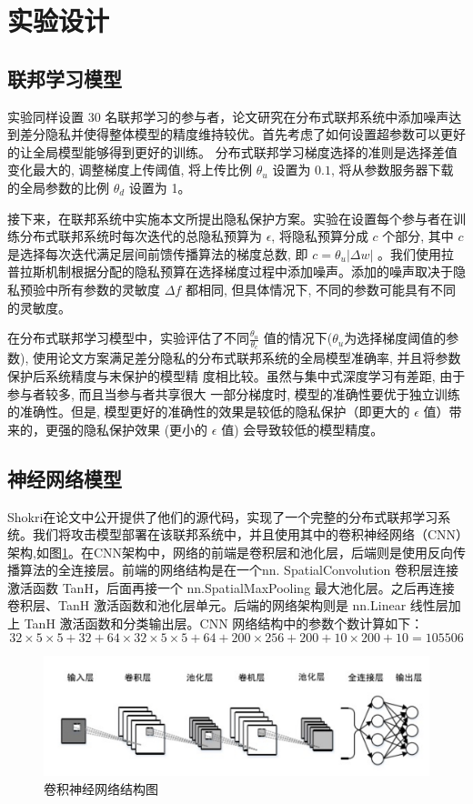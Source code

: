 \section{实验设计}
\subsection{联邦学习模型}
实验同样设置 30 名联邦学习的参与者，论文研究在分布式联邦系统中添加噪声达到差分隐私并使得整体模型的精度维持较优。首先考虑了如何设置超参数可以更好的让全局模型能够得到更好的训练。
分布式联邦学习梯度选择的准则是选择差值变化最大的, 调整梯度上传阈值, 将上传比例 $\theta_{u}$ 设置为 $0.1$, 将从参数服务器下载的全局参数的比例 $\theta_{d}$ 设置为 1。

接下来，在联邦系统中实施本文所提出隐私保护方案。实验在设置每个参与者在训练分布式联邦系统时每次迭代的总隐私预算为 $\epsilon$, 将隐私预算分成 $c$ 个部分, 其中 $c$ 是选择每次迭代满足层间前馈传播算法的梯度总数, 即 $c=\theta_{u}|\Delta w|$ 。我们使用拉普拉斯机制根据分配的隐私预算在选择梯度过程中添加噪声。添加的噪声取决于隐私预验中所有参数的灵敏度 $\Delta f$ 都相同, 但具体情况下, 不同的参数可能具有不同的灵敏度。 

在分布式联邦学习模型中，实验评估了不同$\frac{\theta_{u}}{\theta_{c}}$ 值的情况下($\theta_{u}$为选择梯度阈值的参数), 使用论文方案满足差分隐私的分布式联邦系统的全局模型准确率, 并且将参数保护后系统精度与末保护的模型精 度相比较。虽然与集中式深度学习有差距, 由于参与者较多, 而且当参与者共享很大 一部分梯度时, 模型的准确性要优于独立训练的准确性。但是, 模型更好的准确性的效果是较低的隐私保护（即更大的 $\epsilon$ 值）带来的，更强的隐私保护效果 (更小的 $\epsilon$ 值) 会导致较低的模型精度。

\subsection{神经网络模型}
Shokri在论文中公开提供了他们的源代码，实现了一个完整的分布式联邦学习系统。我们将攻击模型部署在该联邦系统中，并且使用其中的卷积神经网络（CNN）架构,如图\ref{fig:卷积神经网络结构图}。在CNN架构中，网络的前端是卷积层和池化层，后端则是使用反向传播算法的全连接层。前端的网络结构是在一个nn. SpatialConvolution 卷积层连接激活函数 TanH，后面再接一个 nn.SpatialMaxPooling 最大池化层。之后再连接卷积层、TanH 激活函数和池化层单元。后端的网络架构则是 nn.Linear 线性层加上 TanH 激活函数和分类输出层。CNN 网络结构中的参数个数计算如下：
$$
32×5×5 + 32 + 64×32×5×5 + 64 + 200×256 + 200 + 10×200 + 10 = 105506
$$

\begin{figure}[!hbt]
\centering
  	\includegraphics[scale=0.6]{fig2/C5/CNN结构}%
	\caption{卷积神经网络结构图}
  	\label{fig:卷积神经网络结构图} 
\end{figure}

